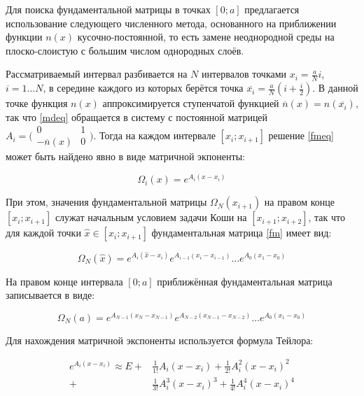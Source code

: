 \documentclass{article}
\numberwithin{equation}{section}
\begin{document}
Для поиска фундаментальной матрицы в точках $[0; a]$ предлагается
использование следующего численного метода, основанного на приближении
функции $n(x)$ кусочно-постоянной, то есть замене неоднородной среды
на плоско-слоистую с большим числом однородных слоёв.

Рассматриваемый интервал разбивается на $N$ интервалов точками
$x_i = \frac{a}{N}i$, $i = 1 \ldots N$, в середине каждого из
которых берётся точка $\overline{x_i} = \frac{a}{N}(i+\frac{i}{2})$. В
данной точке функция $n(x)$ аппроксимируется ступенчатой функцией
$\overline{n}(x) = n(\overline{x_i})$, так что \eqref{mdeq} обращается
в систему с постоянной матрицей $A_i = \bigl(
\begin{smallmatrix}0& 1 \\ -\overline{n}(x)& 0 \end{smallmatrix}
\bigr)$. Тогда на каждом интервале $[x_i; x_{i+1}]$ решение
\eqref{fmeq} может быть найдено явно в виде матричной экпоненты:

\[
\Omega_i(x) = e^{A_i (x - x_i)}
\]

При этом, значения фундаментальной матрицы $\Omega_N(x_{i+1})$ на
правом конце $[x_i; x_{i+1}]$ служат начальным условием задачи Коши на
$[x_{i+1}; x_{i+2}]$, так что для каждой точки $\hat{x} \in [x_i;
x_{i+1}]$ фундаментальная матрица \eqref{fm} имеет вид:

\begin{equation}\label{fmx}
  \Omega_N(\hat{x}) = e^{A_i(\hat{x}-x_i)} e^{A_{i-1}(x_i-x_{i-1})} \ldots e^{A_0(x_1-x_0)}
\end{equation}

На правом конце интервала $[0; a]$ приближённая фундаментальная
матрица записывается в виде:

\begin{equation}\label{fma}
  \Omega_N(a) = e^{A_{N-1}(x_N-x_{N-1})} e^{A_{N-2}(x_{N-1}-x_{N-2})} \ldots e^{A_0(x_1-x_0)}
\end{equation}

Для нахождения матричной экспоненты используется формула Тейлора:

\begin{equation}\label{matrix-exp}
\begin{split}
  e^{A_i(x-x_i)} \approx E +& \frac{1}{1!}{A_i(x-x_i)} +
  \frac{1}{2!}{A_i^2(x-x_i)^2}\\
  +& \frac{1}{3!}{A_i^3(x-x_i)^3} + \frac{1}{4!}{A_i^4(x-x_i)^4}
\end{split}
\end{equation}
\end{document}
